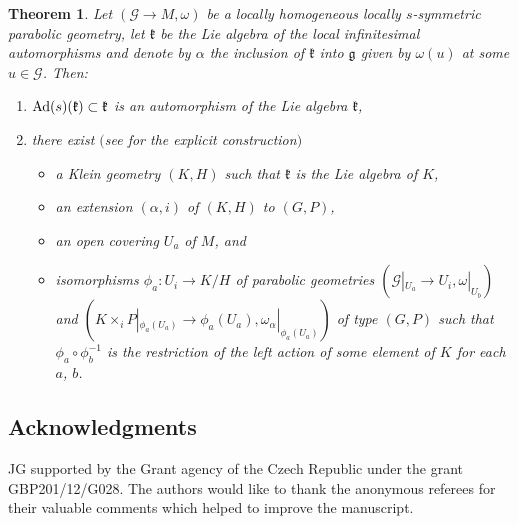 \documentclass[10pt,a4paper]{amsart}
\newcommand{\om}{\omega}
\newcommand{\ba}{\mathcal{G}}
\newcommand{\fg}{\mathfrak g}
\newcommand{\fk}{\mathfrak k}
\newcommand{\Ad}{{\rm Ad}}
\numberwithin{equation}{section}
\newtheorem{Theorem}{Theorem}[section]
\begin{document}
\begin{Theorem} \label{5.1}
Let $(\ba\to M,\om)$ be a locally homogeneous locally $s$-symmetric parabolic geo\-metry, let $\fk$ be the Lie algebra of the local infinitesimal automorphisms and denote by $\alpha$ the inclusion of $\fk$ into $\fg$ given by $\om(u)$ at some $u\in \ba$. Then:
\begin{enumerate}\itemsep=0pt
\item[$1)$] $\Ad(s)(\fk)\subset \fk$ is an automorphism of the Lie algebra $\fk$,
\item[$2)$] there exist $($see {\rm \cite[Section 3]{GZ3}} for the explicit construction$)$
\begin{itemize}\itemsep=0pt
\item a Klein geometry $(K,H)$ such that $\fk$ is the Lie algebra of $K$,
\item an extension $(\alpha,i)$ of $(K,H)$ to $(G,P)$,
\item an open covering $U_a$ of $M$, and
\item isomorphisms $\phi_a\colon U_i\to K/H$ of parabolic geometries $(\ba|_{U_a}\to U_i,\om|_{U_b})$ and $(K\times_{i}P|_{\phi_a(U_a)}\to \phi_a(U_a), \om_\alpha|_{\phi_a(U_a)})$ of type $(G,P)$ such that $\phi_a\circ \phi_b^{-1}$ is the restriction of the left action of some element of $K$ for each $a$, $b$.
\end{itemize}
\end{enumerate}
\end{Theorem}

\subsection*{Acknowledgments}

JG supported by the Grant agency of the Czech Republic under the grant GBP201/12/G028.
The authors would like to thank the anonymous referees for their valuable comments which helped to improve the manuscript.

\end{document}
